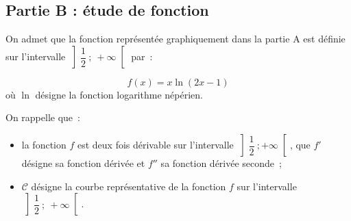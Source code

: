 \subsection*{Partie B : étude de fonction}

On admet que la fonction représentée graphiquement dans la partie A est définie sur l'intervalle $\left]\dfrac{1}{2}~;~+\infty\right[$ par~:

\[f(x) = x\ln(2x-1)\]
où $\ln$ désigne la fonction logarithme népérien.

On rappelle que~:
\begin{itemize}[noitemsep]
\item la fonction $f$ est deux fois dérivable sur l'intervalle $\left]\dfrac{1}{2}~;+\infty\right[$, que $f'$ désigne sa fonction dérivée et $f''$ sa fonction dérivée seconde~;
\item $\mathcal{C}$ désigne la courbe représentative de la fonction $f$ sur l'intervalle $\left]\dfrac{1}{2}~;~+\infty\right[$.
\end{itemize}

